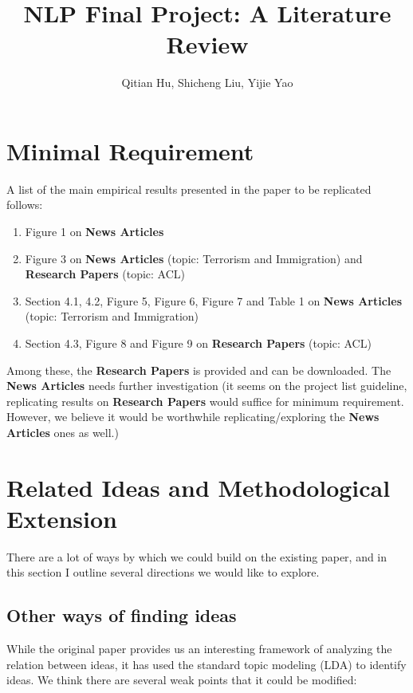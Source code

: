 \documentclass{article}
\title{NLP Final Project: A Literature Review}
\author{Qitian Hu, Shicheng Liu, Yijie Yao}
\begin{document}
\maketitle 

\section{Minimal Requirement}

A list of the main empirical results presented in the paper to be replicated
\cite{original} follows:

\begin{enumerate}
  \item Figure 1 on \textbf{News Articles}
  \item Figure 3 on \textbf{News Articles} (topic: Terrorism and Immigration)
   and \textbf{Research Papers} (topic: ACL)
  \item Section 4.1, 4.2, Figure 5, Figure 6, Figure 7 and Table 1 on 
  \textbf{News Articles} (topic: Terrorism and Immigration)
  \item Section 4.3, Figure 8 and Figure 9 on \textbf{Research Papers} 
  (topic: ACL)
\end{enumerate}

Among these, the \textbf{Research Papers} is provided and can be downloaded. 
The \textbf{News Articles} needs further investigation (it seems on the 
project list guideline, replicating results on \textbf{Research Papers}
would suffice for minimum requirement. However, we believe it would be
worthwhile replicating/exploring the \textbf{News Articles} ones as well.)

\section{Related Ideas and Methodological Extension}


There are a lot of ways by which we could build on the existing paper, and in this section I outline several directions we would like to explore.

\subsection{Other ways of finding ideas}

While the original paper provides us an interesting framework of analyzing the relation between ideas, it has used the standard topic modeling (LDA) to identify ideas. We think there are several weak points that it could be modified:
\end{document}
